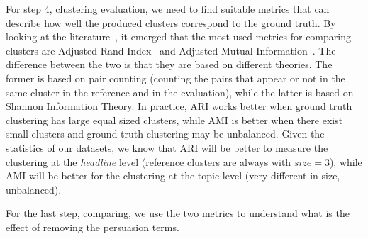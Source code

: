 
For step 4, clustering evaluation, we need to find suitable metrics that can describe how well the produced clusters correspond to the ground truth.
By looking at the literature~\citep{romano2016adjusting}, it emerged that the most used metrics for comparing clusters are Adjusted Rand Index~\citep{rand1971objective} and Adjusted Mutual Information~\citep{vinh2009information}.
The difference between the two is that they are based on different theories. The former is based on pair counting (counting the pairs that appear or not in the same cluster in the reference and in the evaluation), while the latter is based on Shannon Information Theory. In practice, ARI works better when ground truth clustering has large equal sized clusters, while AMI is better when there exist small clusters and ground truth clustering may be unbalanced.
Given the statistics of our datasets, we know that ARI will be better to measure the clustering at the \emph{headline} level (reference clusters are always with $size=3$), while AMI will be better for the clustering at the topic level (very different in size, unbalanced).






For the last step, comparing, we use the two metrics to understand what is the effect of removing the persuasion terms.



